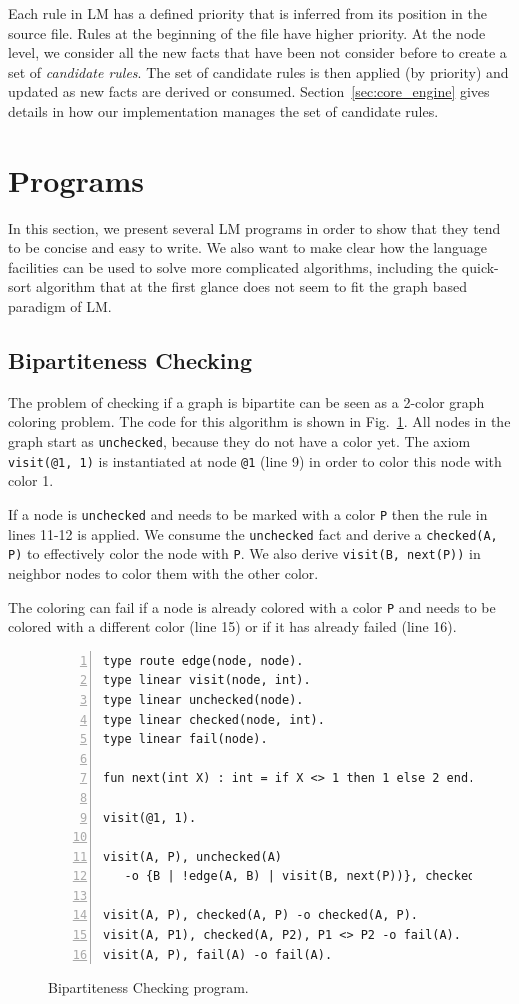Each rule in LM has a defined priority that is inferred from its position in the source file.
Rules at the beginning of the file have higher priority. At the node level, we consider all
the new facts that have been not consider before to create a set of \emph{candidate rules}.
The set of candidate rules is then applied (by priority) and updated as new facts are derived or consumed.
Section~\ref{sec:core_engine} gives details in how our implementation manages the set of candidate rules.

\section{Programs}

In this section, we present several LM programs in order to show that they tend to be concise and
easy to write. We also want to make clear how the language facilities can be used to solve more
complicated algorithms, including the quick-sort algorithm that at the first glance does not seem
to fit the graph based paradigm of LM.

\subsection{Bipartiteness Checking}

The problem of checking if a graph is bipartite can be seen as a 2-color graph coloring problem.
The code for this algorithm is shown in Fig.~\ref{code:bichecking}. All nodes in the graph
start as \texttt{unchecked}, because they do not have a color yet. The axiom \texttt{visit(@1, 1)} is
instantiated at node \texttt{@1} (line 9) in order to color this node with color 1.

If a node is \texttt{unchecked} and needs to be marked with a color \texttt{P} then the rule in
lines 11-12 is applied. We consume the \texttt{unchecked} fact and derive a \texttt{checked(A, P)}
to effectively color the node with \texttt{P}. We also derive \texttt{visit(B, next(P))} in
neighbor nodes to color them with the other color.

The coloring can fail if a node is already colored with a color \texttt{P} and needs to be colored
with a different color (line 15) or if it has already failed (line 16).

\begin{figure}[h!]
\small\begin{Verbatim}[numbers=left]
type route edge(node, node).
type linear visit(node, int).
type linear unchecked(node).
type linear checked(node, int).
type linear fail(node).

fun next(int X) : int = if X <> 1 then 1 else 2 end.

visit(@1, 1).

visit(A, P), unchecked(A)
   -o {B | !edge(A, B) | visit(B, next(P))}, checked(A, P).

visit(A, P), checked(A, P) -o checked(A, P).
visit(A, P1), checked(A, P2), P1 <> P2 -o fail(A).
visit(A, P), fail(A) -o fail(A).
\end{Verbatim}
  \caption{Bipartiteness Checking program.}
  \label{code:bichecking}
\end{figure}
\normalsize

